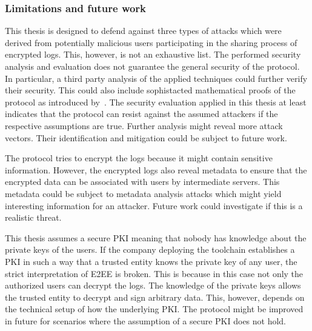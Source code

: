 \documentclass[../main.tex]{subfiles}
\begin{document}
\subsubsection{Limitations and future work}
This thesis is designed to defend against three types of attacks which were derived from potentially malicious users participating in the sharing process of encrypted logs.
This, however, is not an exhaustive list.
The performed security analysis and evaluation does not guarantee the general security of the protocol.
In particular, a third party analysis of the applied techniques could further verify their security.
This could also include sophistacted mathematical proofs of the protocol as introduced by~\cite{Katz2020}.   
The security evaluation applied in this thesis at least indicates that the protocol can resist against the assumed attackers if the respective assumptions are true.
Further analysis might reveal more attack vectors.
Their identification and mitigation could be subject to future work.

The protocol tries to encrypt the logs because it might contain sensitive information.
However, the encrypted logs also reveal metadata to ensure that the encrypted data can be associated with users by intermediate servers.
This metadata could be subject to metadata analysis attacks which might yield interesting information for an attacker.
Future work could investigate if this is a realistic threat.

This thesis assumes a secure PKI meaning that nobody has knowledge about the private keys of the users.
If the company deploying the toolchain establishes a PKI in such a way that a trusted entity knows the private key of any user, the strict interpretation of E2EE is broken.
This is because in this case not only the authorized users can decrypt the logs.
The knowledge of the private keys allows the trusted entity to decrypt and sign arbitrary data.
This, however, depends on the technical setup of how the underlying PKI.
The protocol might be improved in future for scenarios where the assumption of a secure PKI does not hold.
\end{document}
